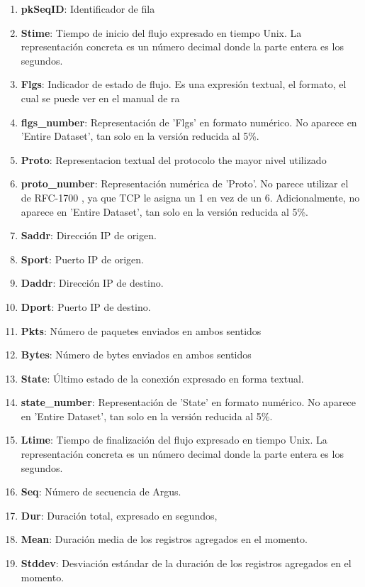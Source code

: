 \begin{enumerate}
    \item \textbf{pkSeqID}: Identificador de fila
    \item \textbf{Stime}: Tiempo de inicio del flujo expresado en tiempo Unix. La representación concreta es un número decimal donde la parte entera es los segundos.
    \item \textbf{Flgs}: Indicador de estado de flujo. Es una expresión textual, el formato, el cual se puede ver en el manual de ra \cite{ratool}
    \item \textbf{flgs\_number}: Representación de 'Flgs' en formato numérico. No aparece en 'Entire Dataset', tan solo en la versión reducida al 5\%.
    \item \textbf{Proto}: Representacion textual del protocolo the mayor nivel utilizado
    \item \textbf{proto\_number}: Representación numérica de 'Proto'. No parece utilizar el de RFC-1700 \cite{rfc1700}, ya que TCP le asigna un 1 en vez de un 6. Adicionalmente, no aparece en 'Entire Dataset', tan solo en la versión reducida al 5\%.
    \item \textbf{Saddr}: Dirección IP de origen.
    \item \textbf{Sport}: Puerto IP de origen.
    \item \textbf{Daddr}: Dirección IP de destino.
    \item \textbf{Dport}: Puerto IP de destino.
    \item \textbf{Pkts}: Número de paquetes enviados en ambos sentidos
    \item \textbf{Bytes}: Número de bytes enviados en ambos sentidos
    \item \textbf{State}: Último estado de la conexión expresado en forma textual.
    \item \textbf{state\_number}: Representación de 'State' en formato numérico. No aparece en 'Entire Dataset', tan solo en la versión reducida al 5\%.
    \item \textbf{Ltime}: Tiempo de finalización del flujo expresado en tiempo Unix. La representación concreta es un número decimal donde la parte entera es los segundos.
    \item \textbf{Seq}: Número de secuencia de Argus.
    \item \textbf{Dur}: Duración total, expresado en segundos,
    \item \textbf{Mean}: Duración media de los registros agregados en el momento.
    \item \textbf{Stddev}: Desviación estándar de la duración de los registros agregados en el momento.

\end{enumerate}
